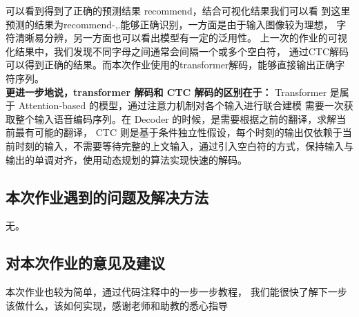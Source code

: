 \documentclass[a4paper]{article}
\begin{document}
\hspace{2em}可以看到得到了正确的预测结果 recommend，结合可视化结果我们可以看
到这里预测的结果为recommend-,.能够正确识别，一方面是由于输入图像较为理想，
字符清晰易分辨，另一方面也可以看出模型有一定的泛用性。
上一次的作业的可视化结果中，我们发现不同字母之间通常会间隔一个或多个空白符，
通过CTC解码可以得到正确的结果。而本次作业使用的transformer解码，能够直接输出正确字符序列。\\

\hspace{2em}\textbf{更进一步地说，transformer 解码和 CTC 解码的区别在于：}
Transformer 是属于 Attention-based 的模型，通过注意力机制对各个输入进行联合建模
需要一次获取整个输入语音编码序列。在 Decoder 的时候，是需要根据之前的翻译，求解当前最有可能的翻译，
CTC 则是基于条件独立性假设，每个时刻的输出仅依赖于当前时刻的输入，不需要等待完整的上文输入，通过引入空白符的方式，保持输入与输出的单调对齐，使用动态规划的算法实现快速的解码。

\subsection{本次作业遇到的问题及解决方法}
无。
\subsection{对本次作业的意见及建议}
本次作业也较为简单，通过代码注释中的一步一步教程，
我们能很快了解下一步该做什么，该如何实现，感谢老师和助教的悉心指导

\end{document}
